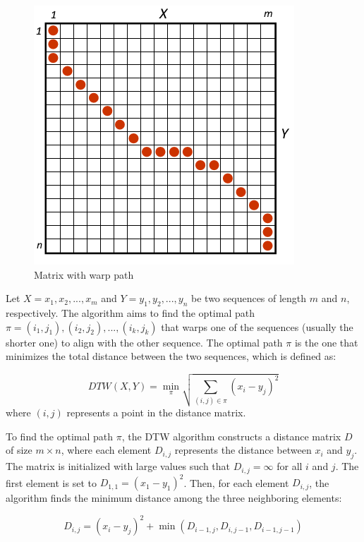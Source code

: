 \documentclass[final,rdr32.tex]{subfiles}
\begin{document}
\begin{figure}[H]
    \begin{center}
        \includegraphics[scale=0.7]{images/DTW.png}
        \caption[caption]{Matrix with warp path}
    \end{center}
\end{figure}


Let $X = {x_1, x_2, ..., x_{m}}$ and $Y = {y_1, y_2, ..., y_{n}}$ be two sequences of length $m$ and $n$, respectively. The algorithm aims to find the optimal path $\pi = {(i_1,j_1),(i_2,j_2),...,(i_k,j_k)}$ that warps one of the sequences (usually the shorter one) to align with the other sequence. The optimal path $\pi$ is the one that minimizes the total distance between the two sequences, which is defined as:

\begin{equation*}
    DTW(X,Y) = \min_{\pi}\sqrt{\sum_{(i,j) \in \pi}(x_i - y_j)^2}
\end{equation*}
where $(i,j)$ represents a point in the distance matrix.

To find the optimal path $\pi$, the DTW algorithm constructs a distance matrix $D$ of size $m \times n$, where each element $D_{i,j}$ represents the distance between $x_i$ and $y_j$. The matrix is initialized with large values such that $D_{i,j} = \infty$ for all $i$ and $j$. The first element is set to $D_{1,1} = (x_1 - y_1)^2$. Then, for each element $D_{i,j}$, the algorithm finds the minimum distance among the three neighboring elements:

\begin{equation*}
    D_{i,j} = (x_i - y_j)^2 + \min(D_{i-1,j}, D_{i,j-1}, D_{i-1,j-1})
\end{equation*}
\end{document}
